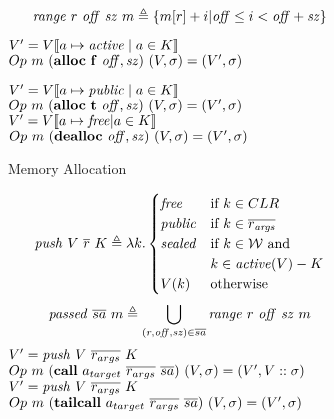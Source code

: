 \documentclass[10pt,conference]{ieeetran}%
\theoremstyle{definition}
\begin{document}
\begin{figure*}
  \begin{subfigure}{0.4\textwidth}
    \[\mathit{range} ~ r ~ \mathit{off} ~ \mathit{sz} ~ m \triangleq
    \{m[r]+i | \mathit{off} \leq i < \mathit{off+sz}\}\]

               {\(V' = V \llbracket a \mapsto \mathit{active} \mid a \in K \rrbracket\)}
               {\(Op ~ m ~ (\mathbf{alloc} ~ \mathbf{f} ~ \mathit{off, sz}) ~ (V,\sigma) = (V',\sigma)\)}

               {\(V' = V \llbracket a \mapsto \mathit{public} \mid a \in K \rrbracket\)}
               {\(Op ~ m ~ (\mathbf{alloc} ~ \mathbf{t} ~ \mathit{off, sz}) ~ (V,\sigma) = (V',\sigma)\)}
               {\(V' = V \llbracket a \mapsto \mathit{free} | a \in K \rrbracket\)}
               {\(Op ~ m ~ (\mathbf{dealloc} ~ \mathit{off, sz}) ~ (V,\sigma) = (V',\sigma)\)}

    \caption{Memory Allocation}
    \label{sfig:publicalloc}
  \end{subfigure}
  \begin{subfigure}{0.6\textwidth}
    \[\mathit{push} ~ V ~ \overline{r} ~ K \triangleq \lambda k .
    \begin{cases}
      \mathit{free} & \textnormal{if } k \in CLR \\
      \mathit{public} & \textnormal{if } k \in \overline{r_{\mathit{args}}} \\
      \mathit{sealed} & \textnormal{if } k \in {\mathcal W} \textnormal{ and } \\
      & k \in \mathit{active}(V) - K \\
      V(k) & \textnormal{otherwise} \\
    \end{cases}      
    \]
    \[\mathit{passed} ~ \overline{sa} ~ m \triangleq \bigcup_{(r,\mathit{off},\mathit{sz}) \in \overline{sa}}
    \mathit{range} ~ r ~ \mathit{off} ~ \mathit{sz} ~ m\]
        {\(V' = \mathit{push} ~ V ~ \overline{r_{args}} ~ K\)}
        {\(Op ~ m ~ (\mathbf{call} ~ a_{target} ~ \overline{r_{args}} ~ \overline{sa})
          ~ (V,\sigma) = (V',V::\sigma)\)}
        {\(V' = \mathit{push} ~ V ~ \overline{r_{args}} ~ K\)}
        {\(Op ~ m ~ (\mathbf{tail call} ~ a_{target} ~ \overline{r_{args}} ~ \overline{sa})
          ~ (V,\sigma) = (V',\sigma)\)}


\end{subfigure}
\end{figure*}
\end{document}
